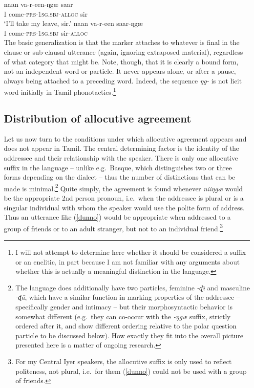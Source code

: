 \documentclass[output=paper, modfonts, nonflat]{langsci/langscibook}
\begin{document}
\ea\label{vocative}
 \ea
   \gll naan va-r-een-ŋgæ{} saar\\
   I come-\textsc{prs}-\textsc{1sg}.\textsc{sbj}-\textsc{alloc}{} sir\\
   \glt `I'll take my leave, sir.'
 \ex
   \gll *naan va-r-een saar-ŋgæ{}\\
   I come-\textsc{prs}-\textsc{1sg}.\textsc{sbj}{} sir-\textsc{alloc}\\
 \z
\z
%
The basic generalization is that the marker attaches to whatever is
final in the clause or sub-clausal utterance (again, ignoring
extraposed material), regardless of what category that might be. Note,
though, that it is clearly a bound form, not an independent word or
particle. It never appears alone, or after a pause, always being
attached to a preceding word. Indeed, the sequence \textit{ŋg-} is
not licit word-initially in Tamil phonotactics.\footnote{I will not
  attempt to determine here whether it should be considered a suffix
  or an enclitic, in part because I am not familiar with any arguments
  about whether this is actually a meaningful distinction in the
  language.}

\subsection{Distribution of allocutive agreement}

Let us now turn to the conditions under which allocutive agreement
appears and does not appear in Tamil.
The central determining factor is the identity of the addressee and
their relationship with the speaker. There is only one allocutive
suffix in the language -- unlike e.g.\ Basque, which distinguishes
two or three forms depending on the dialect -- thus the number of
distinctions that can be made is minimal.\footnote{The language does
  additionally have two particles, feminine \textit{-ɖ\=\i} and
  masculine \textit{-ɖ\=a}, which have a similar function in marking
  properties of the addressee -- specifically gender and intimacy --
  but their morphosyntactic behavior is somewhat different (e.g.\ they
  can co-occur with the \textit{-ŋgæ} suffix, strictly ordered after
  it, and show different ordering relative to the polar question
  particle to be discussed below). How exactly they fit into the
  overall picture presented here is a matter of ongoing research.}
Quite simply, the agreement is found whenever \textit{niiŋgæ}
would be the appropriate 2nd person pronoun, i.e.\ when the addressee
is plural or is a singular individual with whom the speaker would use
the polite form of address. Thus an utterance like (\ref{dunno}) would
be appropriate when addressed to a group of friends or to an adult
stranger, but not to an individual friend.\footnote{For my Central
  Iyer speakers, the allocutive suffix is only used to reflect
  politeness, not plural, i.e.\ for them (\ref{dunno}) could not be
  used with a group of friends.} 
\end{document}
